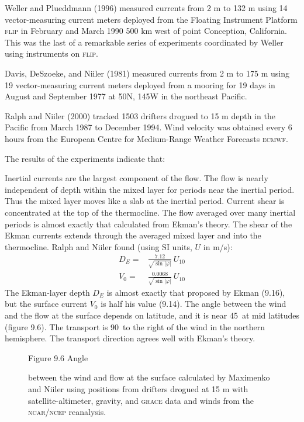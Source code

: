 Weller and Plueddmann (1996) measured currents from 2 m to 132 m using 14
vector-measuring current meters deployed from the Floating Instrument Platform
\textsc{flip} in February and March 1990 500 km west of point Conception,
California.  This was the last of a remarkable series of experiments
coordinated by Weller using instruments on \textsc{flip}.

Davis, DeSzoeke, and Niiler (1981) measured currents from 2 m to 175 m using 19
vector-measuring current meters deployed from a mooring for 19 days in August and
September 1977 at 50\degrees N, 145\degrees W in the northeast Pacific.

Ralph and Niiler (2000) tracked 1503 drifters
drogued to 15 m depth in the Pacific from March 1987 to December 1994. Wind velocity was
obtained every 6 hours from the European Centre for Medium-Range Weather Forecasts
\textsc{ecmwf}.

The results of the experiments indicate that:
\begin{enumerate}
\vitem
Inertial currents are the largest component of the flow.
\vitem
The flow is nearly independent of depth within the mixed layer for periods near the inertial period. Thus the mixed layer moves
like a slab at the inertial period. Current shear is concentrated at the top of the
thermocline.
\vitem
The flow averaged over many inertial periods is almost exactly that calculated
from Ekman's theory. The shear of the Ekman currents extends through the averaged
mixed layer and into the thermocline. Ralph and Niiler
found (using SI units, $U$ in m/s):
\begin{align}
D_E =& \frac{7.12}{\sqrt{\sin|\varphi|}}\, U_{10}\\
V_0 =& \frac{0.0068}{\sqrt{\sin|\varphi|}}\, U_{10}
\end{align}
The Ekman-layer depth $D_E$ is almost exactly that proposed
by Ekman (9.16), but the surface current $V_0$ is half his value (9.14).
\vitem
The angle between the wind and the flow at the surface depends on latitude, and it is near 45\degrees\ at mid latitudes (figure 9.6).
\vitem
The transport is 90\degrees\ to the right of the wind in the northern
hemisphere. The transport direction agrees well with Ekman's theory.
\end{enumerate}
\begin{figure}[t!]
\footnotesize
Figure 9.6 Angle \rule{0mm}{3ex}between the wind and flow at the surface calculated by Maximenko and Niiler using positions from drifters drogued at 15 m with satellite-altimeter, gravity, and \textsc{grace} data and winds from the \textsc{ncar/ncep} reanalysis.
\label{fig:ekmanangle}
\vspace{-3ex}
\end{figure}

